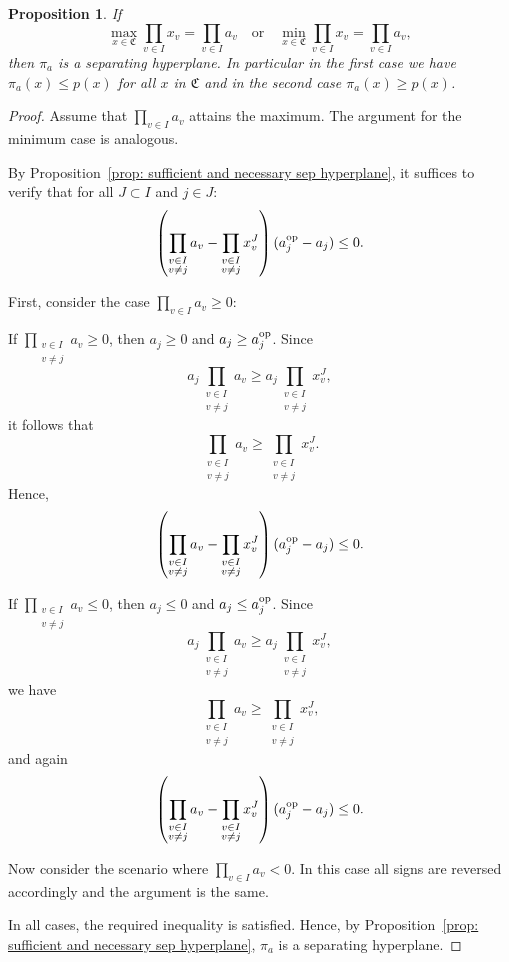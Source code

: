\documentclass{article}
\newtheorem{proposition}[theorem]{Proposition}
\begin{document}
\begin{proposition}
	If 
	\[
	\max_{x \in \mathfrak{C}}\prod_{v \in I}x_v = \prod_{v \in I}a_v 
	\quad\text{or}\quad 
	\min_{x \in \mathfrak{C}}\prod_{v \in I}x_v = \prod_{v \in I}a_v,
	\]
	then \(\pi_a\) is a separating hyperplane. 
	In particular in the first case we have \(\pi_a(x) \leq p(x)\) for all \(x\) in \(\mathfrak{C}\) and in the second case \(\pi_a(x) \geq p(x)\).

	\end{proposition}
	
	\begin{proof}
	Assume that \(\prod_{v \in I}a_v\) attains the maximum. The argument for the minimum case is analogous.
	
	By Proposition~\ref{prop: sufficient and necessary sep hyperplane}, it suffices to verify that for all \(J \subset I\) and \(j \in J\):
	\[
	\left(\prod_{\substack{v \in I \\ v \neq j}}a_v - \prod_{\substack{v \in I \\ v \neq j}}x^{J}_v\right)(a^{\text{op}}_j - a_j) \leq 0.
	\]
	
	First, consider the case \(\prod_{v \in I}a_v \geq 0\):
	
	\item If \(\prod_{\substack{v \in I \\ v \neq j}}a_v \geq 0\), then \(a_j \geq 0\) and \(a_j \geq a^{\text{op}}_j\). Since 
	\[
	a_j\prod_{\substack{v \in I \\ v \neq j}}a_v \geq a_j\prod_{\substack{v \in I \\ v \neq j}}x^{J}_v,
	\]
	it follows that 
	\[
	\prod_{\substack{v \in I \\ v \neq j}}a_v \geq \prod_{\substack{v \in I \\ v \neq j}}x^{J}_v.
	\]
	Hence,
	\[
	\left(\prod_{\substack{v \in I \\ v \neq j}}a_v - \prod_{\substack{v \in I \\ v \neq j}}x^{J}_v\right)(a^{\text{op}}_j - a_j) \leq 0.
	\]
	
	 If \(\prod_{\substack{v \in I \\ v \neq j}}a_v \leq 0\), then \(a_j \leq 0\) and \(a_j \leq a^{\text{op}}_j\). Since
	\[
	a_j\prod_{\substack{v \in I \\ v \neq j}}a_v \geq a_j\prod_{\substack{v \in I \\ v \neq j}}x^{J}_v,
	\]
	we have
	\[
	\prod_{\substack{v \in I \\ v \neq j}}a_v \geq \prod_{\substack{v \in I \\ v \neq j}}x^{J}_v,
	\]
	and again
	\[
	\left(\prod_{\substack{v \in I \\ v \neq j}}a_v - \prod_{\substack{v \in I \\ v \neq j}}x^{J}_v\right)(a^{\text{op}}_j - a_j) \leq 0.
	\]

	
	Now consider the scenario where \(\prod_{v \in I}a_v < 0\). In this case all signs are reversed accordingly and the argument is the same.
	
	In all cases, the required inequality is satisfied. Hence, by Proposition~\ref{prop: sufficient and necessary sep hyperplane}, \(\pi_a\) is a separating hyperplane.
	\end{proof}
	
\end{document}
